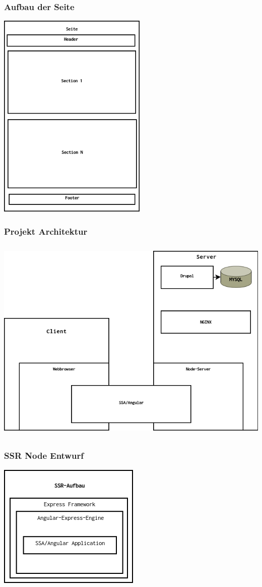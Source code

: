 \documentclass[11pt,a4paper]{article}
\begin{document}
\begin{appendices}
\subsubsection{Aufbau der Seite}
\label{sec:epage}
\includegraphics[scale=0.5,height=10cm]{Seite}
\subsubsection{Projekt Architektur}
\label{sec:eprojekt}
\includegraphics[scale=0.5,height=10cm]{Entwurf}
\subsubsection{SSR Node Entwurf}
\includegraphics[scale=1]{SSR}
\label{sec:essr}

\end{appendices}
\end{document}
